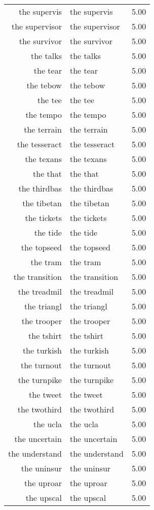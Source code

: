 \begin{table}[ht]
\begin{tabular}{rlr}
  the supervis & the supervis & 5.00 \\ 
  the supervisor & the supervisor & 5.00 \\ 
  the survivor & the survivor & 5.00 \\ 
  the talks & the talks & 5.00 \\ 
  the tear & the tear & 5.00 \\ 
  the tebow & the tebow & 5.00 \\ 
  the tee & the tee & 5.00 \\ 
  the tempo & the tempo & 5.00 \\ 
  the terrain & the terrain & 5.00 \\ 
  the tesseract & the tesseract & 5.00 \\ 
  the texans & the texans & 5.00 \\ 
  the that & the that & 5.00 \\ 
  the thirdbas & the thirdbas & 5.00 \\ 
  the tibetan & the tibetan & 5.00 \\ 
  the tickets & the tickets & 5.00 \\ 
  the tide & the tide & 5.00 \\ 
  the topseed & the topseed & 5.00 \\ 
  the tram & the tram & 5.00 \\ 
  the transition & the transition & 5.00 \\ 
  the treadmil & the treadmil & 5.00 \\ 
  the triangl & the triangl & 5.00 \\ 
  the trooper & the trooper & 5.00 \\ 
  the tshirt & the tshirt & 5.00 \\ 
  the turkish & the turkish & 5.00 \\ 
  the turnout & the turnout & 5.00 \\ 
  the turnpike & the turnpike & 5.00 \\ 
  the tweet & the tweet & 5.00 \\ 
  the twothird & the twothird & 5.00 \\ 
  the ucla & the ucla & 5.00 \\ 
  the uncertain & the uncertain & 5.00 \\ 
  the understand & the understand & 5.00 \\ 
  the uninsur & the uninsur & 5.00 \\ 
  the uproar & the uproar & 5.00 \\ 
  the upscal & the upscal & 5.00 \\ 

\end{tabular}
\end{table}
